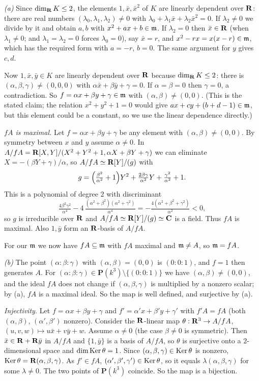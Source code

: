 \documentclass[11pt]{article}
\begin{document}
\emph{(a)} Since $\dim_\mathbf R K\le2$, the elements $1,\bar x,\bar x^2$ of $K$ are linearly dependent over $\mathbf R$: there are real numbers $(\lambda_0,\lambda_1,\lambda_2)\neq0$ with $\lambda_0+\lambda_1\bar x+\lambda_2\bar x^2=0$. If $\lambda_2\ne0$ we divide by it and obtain $a,b$ with $x^2+ax+b\in\mathfrak m$. If $\lambda_2=0$ then $\bar x\in\mathbf R$ (when $\lambda_1\neq0$; and $\lambda_1=\lambda_2=0$ forces $\lambda_0=0$), say $\bar x=r$, and $x^2-rx=x(x-r)\in\mathfrak m$, which has the required form with $a=-r$, $b=0$. The same argument for $y$ gives $c,d$.

Now $1,\bar x,\bar y\in K$ are linearly dependent over $\mathbf R$ because $\dim_\mathbf R K\le2$: there is $(\alpha,\beta,\gamma)\neq(0,0,0)$ with $\alpha\bar x+\beta\bar y+\gamma=0$. If $\alpha=\beta=0$ then $\gamma=0$, a contradiction. So $f=\alpha x+\beta y+\gamma\in\mathfrak m$ with $(\alpha,\beta)\neq(0,0)$. (This is the stated claim; the relation $x^2+y^2+1=0$ would give $ax+cy+(b+d-1)\in\mathfrak m$, but this element could be a constant, so we use the linear dependence directly.)

\emph{$fA$ is maximal.} Let $f=\alpha x+\beta y+\gamma$ be any element with $(\alpha,\beta)\ne(0,0)$. By symmetry between $x$ and $y$ assume $\alpha\neq0$. In $A/fA=\mathbf R[X,Y]/(X^2+Y^2+1,\alpha X+\beta Y+\gamma)$ we can eliminate $X=-(\beta Y+\gamma)/\alpha$, so $A/fA\simeq\mathbf R[Y]/(g)$ with
\[ g=\Bigl(\tfrac{\beta^2}{\alpha^2}+1\Bigr)Y^2+\tfrac{2\beta\gamma}{\alpha^2}Y+\tfrac{\gamma^2}{\alpha^2}+1. \]
This is a polynomial of degree $2$ with discriminant
\[ \tfrac{4\beta^2\gamma^2}{\alpha^4}-4\,\tfrac{(\alpha^2+\beta^2)(\alpha^2+\gamma^2)}{\alpha^4}=-\tfrac{4(\alpha^2+\beta^2+\gamma^2)}{\alpha^2}<0, \]
so $g$ is irreducible over $\mathbf R$ and $A/fA\simeq\mathbf R[Y]/(g)\simeq\mathbf C$ is a field. Thus $fA$ is maximal. Also $1,\bar y$ form an $\mathbf R$-basis of $A/fA$.

For our $\mathfrak m$ we now have $fA\subseteq\mathfrak m$ with $fA$ maximal and $\mathfrak m\neq A$, so $\mathfrak m=fA$.

\emph{(b)} The point $(\alpha:\beta:\gamma)$ with $(\alpha,\beta)=(0,0)$ is $(0:0:1)$, and $f=1$ then generates $A$. For $(\alpha:\beta:\gamma)\in\mathbf P(k^3)\setminus\{(0:0:1)\}$ we have $(\alpha,\beta)\neq(0,0)$, and the ideal $fA$ does not change if $(\alpha,\beta,\gamma)$ is multiplied by a nonzero scalar; by (a), $fA$ is a maximal ideal. So the map is well defined, and surjective by (a).

\emph{Injectivity.} Let $f=\alpha x+\beta y+\gamma$ and $f'=\alpha'x+\beta'y+\gamma'$ with $f'A=fA$ (both $(\alpha,\beta)$, $(\alpha',\beta')$ nonzero). Consider the $\mathbf R$-linear map $\theta:\mathbf R^3\to A/fA$, $(u,v,w)\mapsto u\bar x+v\bar y+w$. Assume $\alpha\neq0$ (the case $\beta\ne0$ is symmetric). Then $\bar x\in\mathbf R+\mathbf R\bar y$ in $A/fA$ and $\{1,\bar y\}$ is a basis of $A/fA$, so $\theta$ is surjective onto a $2$-dimensional space and $\dim\operatorname{Ker}\theta=1$. Since $(\alpha,\beta,\gamma)\in\operatorname{Ker}\theta$ is nonzero, $\operatorname{Ker}\theta=\mathbf R(\alpha,\beta,\gamma)$. As $f'\in fA$, $(\alpha',\beta',\gamma')\in\operatorname{Ker}\theta$, so it equals $\lambda(\alpha,\beta,\gamma)$ for some $\lambda\neq0$. The two points of $\mathbf P(k^3)$ coincide. So the map is a bijection.
\end{document}
